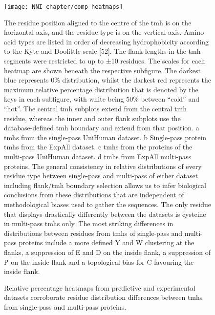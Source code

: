 \begin{figure}[p]
\centering
\texttt{[image: NNI\_chapter/comp\_heatmaps]}
\caption{Relative percentage heatmaps from predictive and experimental datasets corroborate residue distribution differences between \gls{tmh}s from single-pass and multi-pass proteins.}
\medskip
\justify
\footnotesize
The residue position aligned to the centre of the \gls{tmh} is on the horizontal axis, and the residue type is on the vertical axis. Amino acid types are listed in order of decreasing hydrophobicity according to the Kyte and Doolittle scale [52]. The flank lengths in the \gls{tmh} segments were restricted to up to ±10 residues. The scales for each heatmap are shown beneath the respective subfigure. The darkest blue represents 0\% distribution, whilst the darkest red represents the maximum relative percentage distribution that is denoted by the keys in each subfigure, with white being 50\% between “cold” and “hot”. The central \gls{tmh} subplots extend from the central \gls{tmh} residue, whereas the inner and outer flank subplots use the database-defined \gls{tmh} boundary and extend from that position. a \gls{tmh}s from the single-pass UniHuman dataset. b Single-pass protein \gls{tmh}s from the ExpAll dataset. c \gls{tmh}s from the proteins of the multi-pass UniHuman dataset. d \gls{tmh}s from ExpAll multi-pass proteins. The general consistency in relative distributions of every residue type between single-pass and multi-pass of either dataset including flank/\gls{tmh} boundary selection allows us to infer biological conclusions from these distributions that are independent of methodological biases used to gather the sequences. The only residue that displays drastically differently between the datasets is cysteine in multi-pass \gls{tmh}s only. The most striking differences in distributions between residues from \gls{tmh}s of single-pass and multi-pass proteins include a more defined Y and W clustering at the flanks, a suppression of E and D on the inside flank, a suppression of P on the inside flank and a topological bias for C favouring the inside flank.
\label{fig:comp_heatmaps}
\end{figure}

